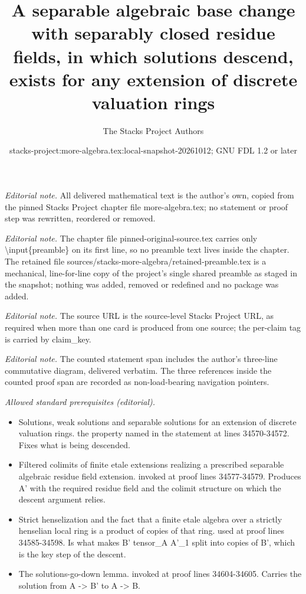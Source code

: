 \documentclass[10pt,a4paper]{amsart}
\title{A separable algebraic base change with separably closed residue fields, in which solutions descend, exists for any extension of discrete valuation rings}
\author{The Stacks Project Authors}
\date{stacks-project:more-algebra.tex:local-snapshot-20261012; GNU FDL 1.2 or later}
\theoremstyle{plain}
\theoremstyle{definition}
\theoremstyle{remark}
\numberwithin{equation}{subsection}
\begin{document}
\maketitle
\setcounter{subsection}{1}
\noindent\textit{Editorial note.} All delivered mathematical text is the author's own, copied from the pinned Stacks Project chapter file more-algebra.tex; no statement or proof step was rewritten, reordered or removed.\par\medskip
\noindent\textit{Editorial note.} The chapter file pinned-original-source.tex carries only \textbackslash{}input\{preamble\} on its first line, so no preamble text lives inside the chapter. The retained file sources/stacks-more-algebra/retained-preamble.tex is a mechanical, line-for-line copy of the project's single shared preamble as staged in the snapshot; nothing was added, removed or redefined and no package was added.\par\medskip
\noindent\textit{Editorial note.} The source URL is the source-level Stacks Project URL, as required when more than one card is produced from one source; the per-claim tag is carried by claim\_key.\par\medskip
\noindent\textit{Editorial note.} The counted statement span includes the author's three-line commutative diagram, delivered verbatim. The three references inside the counted proof span are recorded as non-load-bearing navigation pointers.\par\medskip
\noindent\textit{Allowed standard prerequisites (editorial).}\begin{itemize}
\item Solutions, weak solutions and separable solutions for an extension of discrete valuation rings. the property named in the statement at lines 34570-34572. Fixes what is being descended.
\item Filtered colimits of finite etale extensions realizing a prescribed separable algebraic residue field extension. invoked at proof lines 34577-34579. Produces A' with the required residue field and the colimit structure on which the descent argument relies.
\item Strict henselization and the fact that a finite etale algebra over a strictly henselian local ring is a product of copies of that ring. used at proof lines 34585-34598. Is what makes B' tensor\_A A'\_1 split into copies of B', which is the key step of the descent.
\item The solutions-go-down lemma. invoked at proof lines 34604-34605. Carries the solution from A -> B' to A -> B.
\end{itemize}\medskip
\end{document}
